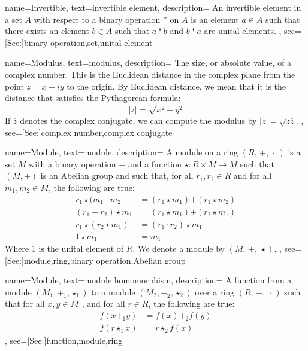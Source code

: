 {
    name={Invertible},
    text={invertible element},
    description={
        An invertible element in a set $A$ with respect to a binary
        operation $*$ on $A$ is an element $a\in{A}$ such that there
        exists an element $b\in{A}$ such that $a*b$ and $b*a$ are
        unital elements.
    },
    see=[See:]{binary operation,set,unital element}
}

{
    name={Modulus},
    text={modulus},
    description={
        The size, or absolute value, of a complex number. This is the
        Euclidean distance in the complex plane from the point $z=x+iy$
        to the origin. By Euclidean distance, we mean that it is the
        distance that satisfies the Pythagorean formula:
        \begin{equation*}
            |z|=\sqrt{x^{2}+y^{2}}
        \end{equation*}
        If $\overline{z}$ denotes the complex conjugate, we can compute
        the modulus by $|z|=\sqrt{z\overline{z}}$.
    },
    see=[See:]{complex number,complex conjugate}
}

{
    name={Module},
    text={module},
    description={
        A module on a ring $(R,\,+,\,\cdot\,)$ is a set $M$ with a binary
        operation $\boldsymbol{+}$ and a function
        $\star:R\times{M}\rightarrow{M}$ such that $(M,\boldsymbol{+})$ is
        an Abelian group and such that, for all $r_{1},r_{2}\in{R}$ and for
        all $m_{1},m_{2}\in{M}$, the following are true:
        {%
            \begin{align*}
                r_{1}\star(m_{1}\boldsymbol{+}m_{2}
                &=(r_{1}\star{m}_{1})\boldsymbol{+}(r_{1}\star{m}_{2})\\
                (r_{1}+r_{2})\star{m}_{1}
                &=(r_{1}\star{m}_{1})\boldsymbol{+}(r_{2}\star{m}_{1})\\
                r_{1}\star(r_{2}\star{m}_{1})
                &=(r_{1}\cdot{r}_{2})\star{m}_{1}\\
                1\star{m}_{1}&=m_{1}
            \end{align*}
        }
        Where 1 is the unital element of $R$. We denote a module by
        $(M,\,\boldsymbol{+},\,\star)$.
    },
    see=[See:]{module,ring,binary operation,Abelian group}
}

{
    name={Module},
    text={module homomorphism},
    description={
        A function from a module $(M_{1},\boldsymbol{+}_{1},\star_{1})$
        to a module $(M_{2},\boldsymbol{+}_{2},\star_{2})$ over a ring
        $(R,\,+,\,\cdot\,)$ such that for all $x,y\in{M}_{1}$, and for all
        $r\in{R}$, the following are true:
        {%
            \begin{align*}
                f(x\boldsymbol{+}_{1}y)&=f(x)\boldsymbol{+}_{2}f(y)\\
                f(r\star_{1}{x})&=r\star_{2}f(x)
            \end{align*}
        }
    },
    see=[See:]{function,module,ring}
}

